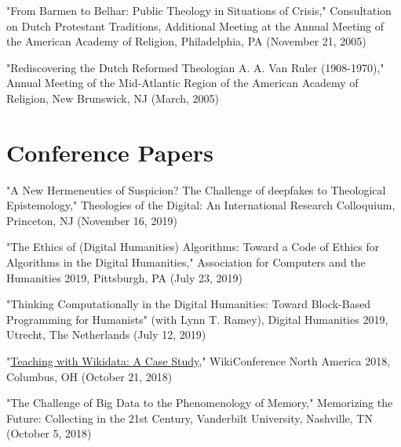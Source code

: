 \documentclass[10pt]{res} %
\begin{document}
\begin{resume}
\begin{hangparas}{.25in}{1}"From Barmen to Belhar: Public Theology in Situations of Crisis," Consultation on Dutch Protestant Traditions, Additional Meeting at the Annual Meeting of the American Academy of Religion, Philadelphia, PA (November 21, 2005)\end{hangparas}

\begin{hangparas}{.25in}{1}"Rediscovering the Dutch Reformed Theologian A. A. Van Ruler (1908-1970)," Annual Meeting of the Mid-Atlantic Region of the American Academy of Religion, New Brunswick, NJ (March, 2005)\end{hangparas}

\section{Conference Papers}

\begin{hangparas}{.25in}{1}"A New Hermeneutics of Suspicion? The Challenge of deepfakes to Theological Epistemology," Theologies of the Digital: An International Research Colloquium, Princeton, NJ (November 16, 2019)\end{hangparas}

\begin{hangparas}{.25in}{1}"The Ethics of (Digital Humanities) Algorithms: Toward a Code of Ethics for Algorithms in the Digital Humanities," Association for Computers and the Humanities 2019, Pittsburgh, PA (July 23, 2019)\end{hangparas}

\begin{hangparas}{.25in}{1}"Thinking Computationally in the Digital Humanities: Toward Block-Based Programming for Humanists" (with Lynn T. Ramey), Digital Humanities 2019, Utrecht, The Netherlands (July 12, 2019)\end{hangparas}

\begin{hangparas}{.25in}{1}"\href{https://commons.wikimedia.org/wiki/File:Teaching_with_Wikidata-A_Case_Study.pdf}{Teaching with Wikidata: A Case Study}," WikiConference North America 2018, Columbus, OH (October 21, 2018)\end{hangparas}

\begin{hangparas}{.25in}{1}"The Challenge of Big Data to the Phenomenology of Memory," Memorizing the Future: Collecting in the 21st Century, Vanderbilt University, Nashville, TN (October 5, 2018)\end{hangparas}


\end{resume}
\end{document}
